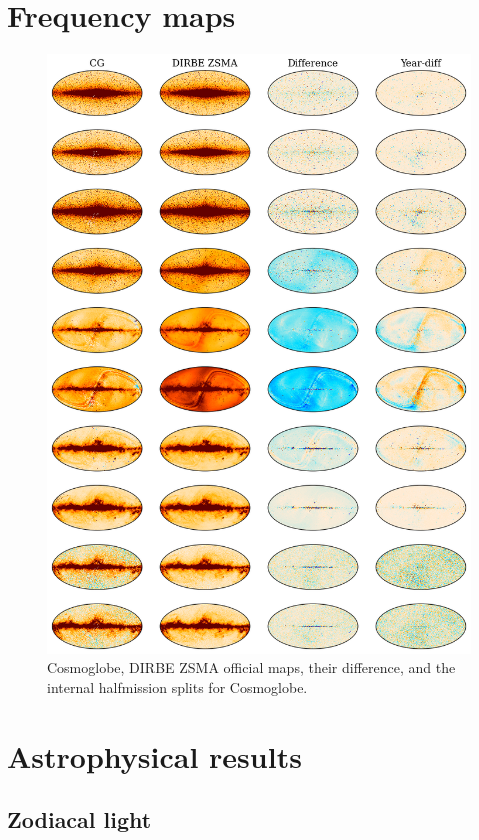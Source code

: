 \documentclass{aa}
\begin{document}
\section{Frequency maps}
\begin{figure}
	\centering
	\includegraphics[width=\linewidth]{figs/diff_grid.png}
	\caption{Cosmoglobe, DIRBE ZSMA official maps, their difference, and the internal halfmission splits for Cosmoglobe.}
	\label{fig:diff_grid}
\end{figure}

\section{Astrophysical results}
\subsection{Zodiacal light}
\end{document}
